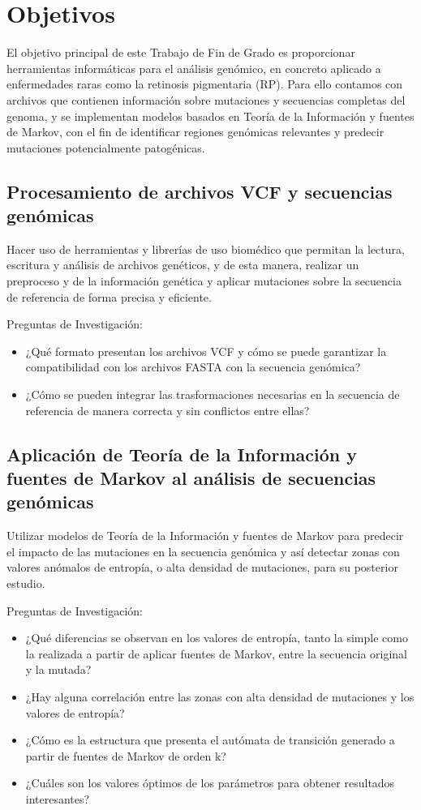 \documentclass[11pt,spanish,listoffigures,listoftables]{tfgetsinf}
\begin{document}
\section{Objetivos}

El objetivo principal de este Trabajo de Fin de Grado es proporcionar herramientas informáticas para el análisis genómico, en concreto aplicado a enfermedades raras como la retinosis pigmentaria (\ac{RP}). Para ello contamos con archivos que contienen información sobre mutaciones y secuencias completas del genoma, y se implementan modelos basados en Teoría de la Información y fuentes de Markov, con el fin de identificar regiones genómicas relevantes y predecir mutaciones potencialmente patogénicas.

\subsection{Procesamiento de archivos \ac{VCF} y secuencias genómicas}

Hacer uso de herramientas y librerías de uso biomédico que permitan la lectura, escritura y análisis de archivos genéticos, y de esta manera, realizar un preproceso y de la información genética y aplicar mutaciones sobre la secuencia de referencia de forma precisa y eficiente.

Preguntas de Investigación: 
\begin{itemize}
\item ¿Qué formato presentan los archivos \ac{VCF} y cómo se puede garantizar la compatibilidad con los archivos \ac{FASTA} con la secuencia genómica?
\item ¿Cómo se pueden integrar las trasformaciones necesarias en la secuencia de referencia de manera correcta y sin conflictos entre ellas?
\end{itemize}

\subsection{Aplicación de Teoría de la Información y fuentes de Markov al análisis de secuencias genómicas }

Utilizar modelos de Teoría de la Información y fuentes de Markov para predecir el impacto de las mutaciones en la secuencia genómica y así detectar zonas con valores anómalos de entropía, o alta densidad de mutaciones, para su posterior estudio. 

Preguntas de Investigación: 
\begin{itemize}
\item ¿Qué diferencias se observan en los valores de entropía, tanto la simple como la realizada a partir de aplicar fuentes de Markov, entre la secuencia original y la mutada? 
\item ¿Hay alguna correlación entre las zonas con alta densidad de mutaciones y los valores de entropía? 
\item ¿Cómo es la estructura que presenta el autómata de transición generado a partir de fuentes de Markov de orden k? 
\item ¿Cuáles son los valores óptimos de los parámetros para obtener resultados interesantes? 
\end{itemize}
\end{document}
